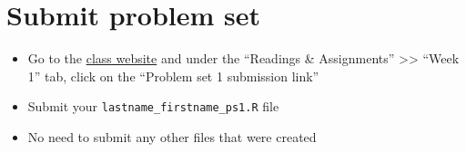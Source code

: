 \documentclass[
]{article}
\providecommand{\tightlist}{%
  \setlength{\itemsep}{0pt}\setlength{\parskip}{0pt}}
\begin{document}
\hypertarget{submit-problem-set}{%
\section{Submit problem set}\label{submit-problem-set}}

\begin{itemize}
\tightlist
\item
  Go to the \href{https://anyone-can-cook.github.io/rclass2/}{class
  website} and under the ``Readings \& Assignments''
  \textgreater\textgreater{} ``Week 1'' tab, click on the ``Problem set
  1 submission link''
\item
  Submit your \texttt{lastname\_firstname\_ps1.R} file
\item
  No need to submit any other files that were created
\end{itemize}
\end{document}
